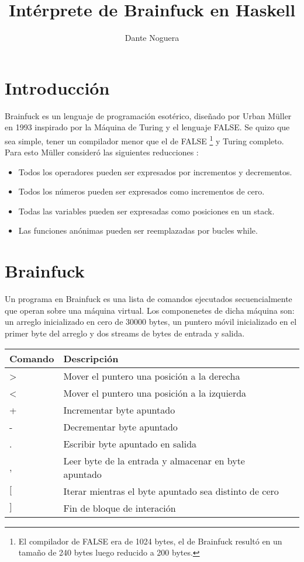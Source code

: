 \documentclass[a4paper, 12pt]{article}
\title{Int\'erprete de Brainfuck en Haskell}
\author{Dante Noguera}
\date{}
\begin{document}
\section*{Introducción}

Brainfuck es un lenguaje de programación esotérico, diseñado por Urban Müller en 1993 inspirado por la Máquina de Turing y el lenguaje FALSE.
Se quizo que sea simple, tener un compilador menor que el de FALSE \footnote{El compilador de FALSE era de 1024 bytes, el de Brainfuck resultó en un tamaño de 240 bytes luego reducido a 200 bytes.} y Turing completo. 
Para esto Müller consideró las siguientes reducciones \cite{y}:
\begin{itemize}
	\item Todos los operadores pueden ser expresados por incrementos y decrementos.
	\item Todos los números pueden ser expresados como incrementos de cero.
	\item Todas las variables pueden ser expresadas como posiciones en un stack.
	\item Las funciones anónimas pueden ser reemplazadas por bucles while.
\end{itemize}


\section*{Brainfuck}

Un programa en Brainfuck es una lista de comandos ejecutados secuencialmente que operan sobre una máquina virtual. Los componenetes de dicha máquina son: un arreglo inicializado en cero de 30000 bytes, un puntero móvil inicializado en el primer byte del arreglo y dos streams de bytes de entrada y salida.

\begin{center}
\begin{tabular}{ |l|l|l| } 
 \hline
 Comando & Descripción \\
 \hline
 \textgreater & Mover el puntero una posición a la derecha \\ 
 \textless & Mover el puntero una posición a la izquierda \\ 
 + & Incrementar byte apuntado \\ 
 - & Decrementar byte apuntado \\ 
 . & Escribir byte apuntado en salida\\ 
 , & Leer byte de la entrada y almacenar en byte apuntado \\ 
 $[$ & Iterar mientras el byte apuntado sea distinto de cero \\ 
 $]$ & Fin de bloque de interación \\ 
 \hline
\end{tabular}
\end{center}
\end{document}
